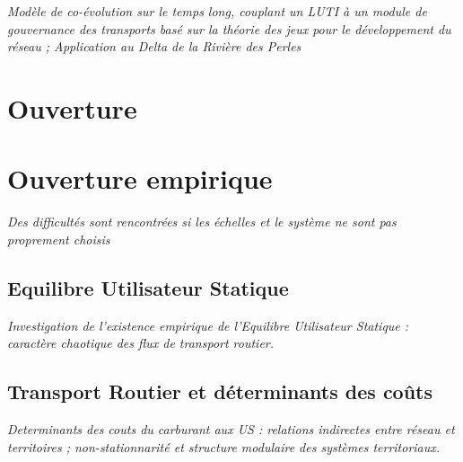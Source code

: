 
\textit{Modèle de co-évolution sur le temps long, couplant un LUTI à un module de gouvernance des transports basé sur la théorie des jeux pour le développement du réseau ; Application au Delta de la Rivière des Perles}







\section{Ouverture}




\section{Ouverture empirique}

\textit{Des difficultés sont rencontrées si les échelles et le système ne sont pas proprement choisis}

\subsection{Equilibre Utilisateur Statique}

\textit{Investigation de l'existence empirique de l'Equilibre Utilisateur Statique : caractère chaotique des flux de transport routier.}


\subsection{Transport Routier et déterminants des coûts}

\textit{Determinants des couts du carburant aux US : relations indirectes entre réseau et territoires ; non-stationnarité et structure modulaire des systèmes territoriaux.}








